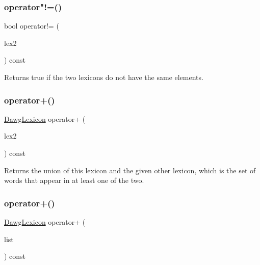 \mbox{\label{classDawgLexicon_a8d198a4165303f1e4877005141c43e31}} 
\subsubsection{\texorpdfstring{operator"!=()}{operator!=()}}
{\footnotesize\ttfamily bool operator!= (\begin{DoxyParamCaption}\item[{const \mbox{\hyperlink{classDawgLexicon}{Dawg\+Lexicon}} \&}]{lex2 }\end{DoxyParamCaption}) const}



Returns true if the two lexicons do not have the same elements. 

\mbox{\label{classDawgLexicon_ad1dee5fbe47180dbadb3952bb37643ae}} 
\subsubsection{\texorpdfstring{operator+()}{operator+()}\hspace{0.1cm}{\footnotesize\ttfamily [1/3]}}
{\footnotesize\ttfamily \mbox{\hyperlink{classDawgLexicon}{Dawg\+Lexicon}} operator+ (\begin{DoxyParamCaption}\item[{const \mbox{\hyperlink{classDawgLexicon}{Dawg\+Lexicon}} \&}]{lex2 }\end{DoxyParamCaption}) const}



Returns the union of this lexicon and the given other lexicon, which is the set of words that appear in at least one of the two. 

\mbox{\label{classDawgLexicon_a41fac68795179c64eea3dc4c86a30814}} 
\subsubsection{\texorpdfstring{operator+()}{operator+()}\hspace{0.1cm}{\footnotesize\ttfamily [2/3]}}
{\footnotesize\ttfamily \mbox{\hyperlink{classDawgLexicon}{Dawg\+Lexicon}} operator+ (\begin{DoxyParamCaption}\item[{std\+::initializer\+\_\+list$<$ std\+::string $>$}]{list }\end{DoxyParamCaption}) const}



